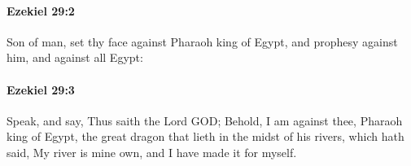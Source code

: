 		\paragraph{Ezekiel 29:2} %
			\label{EZEKIEL-29-2}

			Son of man, set thy face against Pharaoh king of Egypt, and prophesy against him, and against all Egypt:


		\paragraph{Ezekiel 29:3} %
			\label{EZEKIEL-29-3}

			Speak, and say, Thus saith the Lord GOD; Behold, I am against thee, Pharaoh king of Egypt, the great dragon that lieth in the midst of his rivers, which hath said, My river is mine own, and I have made it for myself.


